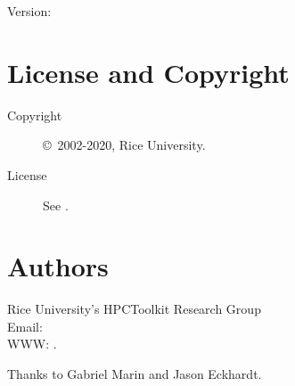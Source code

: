 \documentclass[english]{article}
\begin{document}
Version: \Version

\section{License and Copyright}

\begin{description}
\item[Copyright] \copyright\ 2002-2020, Rice University.
\item[License] See .
\end{description}

\section{Authors}

\noindent
Rice University's HPCToolkit Research Group \\
Email:  \\
WWW: .

Thanks to Gabriel Marin and Jason Eckhardt.

\LatexManEnd
\end{document}
